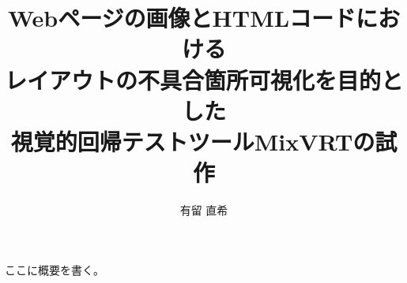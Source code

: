 \documentclass[uplatex, report, a4j, 10pt]{jsbook}
\title{Webページの画像とHTMLコードにおける\\レイアウトの不具合箇所可視化を目的とした\\視覚的回帰テストツールMixVRTの試作}
\author{有留 直希}
\begin{document}
\maketitle

%
% 
ここに概要を書く。


%
% 








%


%

\end{document}
